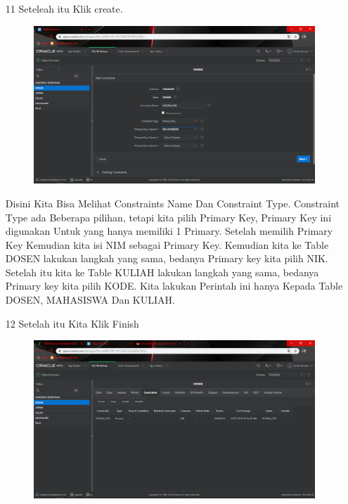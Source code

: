 \begin{enumerate}
\item[11]Seteleah itu Klik create.

\begin{figure}[!htbp]
    \begin{center}
    \includegraphics[scale=0.3]{figures/10.png}
    \end{center}   
    \end{figure}
    
\par
Disini Kita Bisa Melihat Constraints Name Dan Constraint Type. Constraint Type ada Beberapa pilihan, tetapi kita pilih Primary Key, Primary Key ini digunakan Untuk yang hanya memiliki 1 Primary. Setelah memilih Primary Key Kemudian kita isi NIM sebagai Primary Key. Kemudian kita ke Table DOSEN lakukan langkah yang sama, bedanya Primary key kita pilih NIK. Setelah itu kita ke Table KULIAH lakukan langkah yang sama, bedanya Primary key kita pilih KODE. Kita lakukan Perintah ini hanya Kepada Table DOSEN, MAHASISWA Dan KULIAH.
\newpage
\item[12]Setelah itu Kita Klik Finish

\begin{figure}[!htbp]
    \begin{center}
    \includegraphics[scale=0.3]{figures/11.png}
    \end{center}   
    \end{figure}
    

\end{enumerate}
